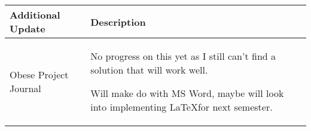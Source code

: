 \begin{table}[!h]
    \centering
    \begin{tabularx}{\textwidth}{|l|X|}
        \hline
        Additional Update & Description \\
        \hline
        \hline
        Obese Project Journal & 
        \begin{myitemize}
            \item No progress on this yet as I still can't find a solution that will work well.
            \item Will make do with MS Word, maybe will look into implementing \LaTeX for next semester.
        \end{myitemize} \\
        \hline
    \end{tabularx}
\end{table}
